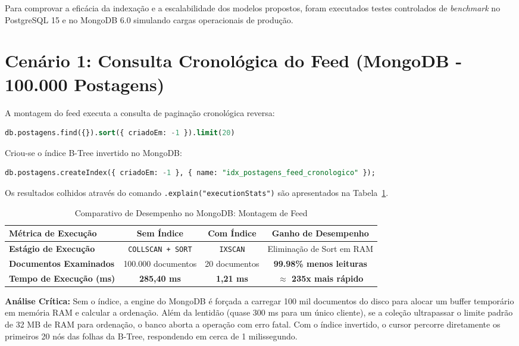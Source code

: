 \documentclass[12pt,a4paper]{report}
\begin{document}
Para comprovar a eficácia da indexação e a escalabilidade dos modelos propostos, foram executados testes controlados de \textit{benchmark} no PostgreSQL 15 e no MongoDB 6.0 simulando cargas operacionais de produção.

\section{Cenário 1: Consulta Cronológica do Feed (MongoDB - 100.000 Postagens)}
A montagem do feed executa a consulta de paginação cronológica reversa:
\begin{lstlisting}[language=SQL]
db.postagens.find({}).sort({ criadoEm: -1 }).limit(20)
\end{lstlisting}

Criou-se o índice B-Tree invertido no MongoDB:
\begin{lstlisting}[language=SQL]
db.postagens.createIndex({ criadoEm: -1 }, { name: "idx_postagens_feed_cronologico" });
\end{lstlisting}

Os resultados colhidos através do comando \texttt{.explain("executionStats")} são apresentados na Tabela~\ref{tab:bench_mongo}.

\begin{table}[H]
\centering
\small
\caption{Comparativo de Desempenho no MongoDB: Montagem de Feed}
\label{tab:bench_mongo}
\begin{tabular}{@{}lccc@{}}
\toprule
\textbf{Métrica de Execução} & \textbf{Sem Índice} & \textbf{Com Índice} & \textbf{Ganho de Desempenho} \\ \midrule
\textbf{Estágio de Execução} & \texttt{COLLSCAN + SORT} & \texttt{IXSCAN} & Eliminação de Sort em RAM \\
\textbf{Documentos Examinados} & 100.000 documentos & 20 documentos & \textbf{99.98\% menos leituras} \\
\textbf{Tempo de Execução (ms)} & \textbf{285,40 ms} & \textbf{1,21 ms} & \textbf{$\approx$ 235x mais rápido} \\ \bottomrule
\end{tabular}
\end{table}

\textbf{Análise Crítica:} Sem o índice, a engine do MongoDB é forçada a carregar 100 mil documentos do disco para alocar um buffer temporário em memória RAM e calcular a ordenação. Além da lentidão (quase 300 ms para um único cliente), se a coleção ultrapassar o limite padrão de 32 MB de RAM para ordenação, o banco aborta a operação com erro fatal. Com o índice invertido, o cursor percorre diretamente os primeiros 20 nós das folhas da B-Tree, respondendo em cerca de 1 milissegundo.
\end{document}
